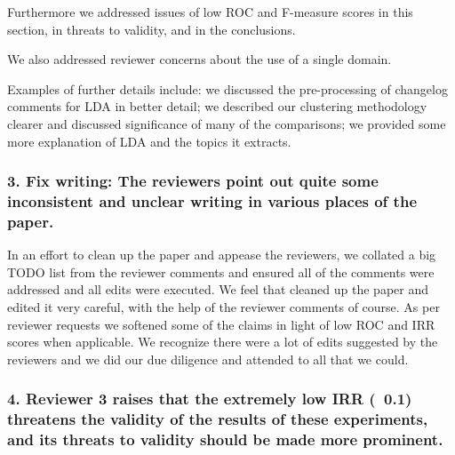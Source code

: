 \documentclass{article}
\begin{document}
Furthermore we addressed issues of low ROC and F-measure scores in
this section, in threats to validity, and in the conclusions.

We also addressed reviewer concerns about the use of a single domain.

Examples of further details include: we discussed the pre-processing
of changelog comments for LDA in better detail; we described our
clustering methodology clearer and discussed significance of many of
the comparisons; we provided some more explanation of LDA and the
topics it extracts.

\begin{comment}
         - Re: in the "Creating a Validation Corpus" we addressed why we
           used ROC over F-Measure: class imbalance leads to bias in
           F-Measure. And we cited relevant work that discussed this
           particular issue.            

         - Re: we explained some reasons for low ROC scores.

         - Re: in threats to validity, internal validity, we discussed skewed classes

     - Re: we responded on page 6 and in the threats to validity about
       the issues of a single domain

    - Re: discussed LDA word distributions

    - in the clustering section we described our methodology clearer
    - we better described LDA preprocessing
\end{comment}

\subsubsection*{
  3. Fix writing: The reviewers point out quite some inconsistent and
  unclear writing in various places of the paper.}

In an effort to clean up the paper and appease the reviewers, we
collated a big TODO list from the reviewer comments and ensured all of
the comments were addressed and all edits were executed. We feel that
cleaned up the paper and edited it very careful, with the help of the
reviewer comments of course.  As per reviewer requests we softened
some of the claims in light of low ROC and IRR scores when applicable.
We recognize there were a lot of edits suggested by the reviewers and
we did our due diligence and attended to all that we could.

\subsubsection*{4.  Reviewer 3 raises that the extremely low IRR (~0.1) threatens the
   validity of the results of these experiments, and its threats to
   validity should be made more prominent.}
\end{document}
